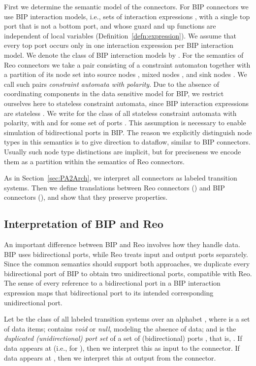 \documentclass[submission,copyright,creativecommons,hidelinks]{eptcs}
\theoremstyle{plain} \newtheorem{theorem}{Theorem}
\theoremstyle{definition}
\theoremstyle{remark}
\newcommand{\defn}[1]{Definition~\ref{defn:#1}}
\newcommand{\secn}[1]{Section~\ref{sec:#1}}
\begin{document}
First we determine the semantic model of the connectors. For BIP connectors we use BIP interaction models, i.e., sets of interaction expressions , with a single top port that is not a bottom port, and whose guard and up functions are independent of local variables (\defn{expression}). We assume that every top port occurs only in one interaction expression per BIP interaction model. We denote the class of BIP interaction models by .
For the semantics of Reo connectors we take a pair consisting of a constraint automaton together with a partition of its node set into source nodes , mixed nodes , and sink nodes . We call such pairs \emph{constraint automata with polarity}. 
Due to the absence of coordinating components in the data sensitive model for BIP, we restrict ourselves here to stateless constraint automata, since BIP interaction expressions are stateless \cite{ABBJS14, BBJS14}.
We write  for the class of all stateless constraint automata with polarity, with  and  for some set of ports . This assumption is necessary to enable simulation of bidirectional ports in BIP. The reason we explicitly distinguish node types in this semantics is to give direction to dataflow, similar to BIP connectors. Usually such node type distinctions are implicit, but for preciseness we encode them as a partition within the semantics of Reo connectors. 

As in \secn{PA2Arch}, we interpret all connectors as labeled transition systems. Then we define translations between Reo connectors () and BIP connectors (), and show that they preserve properties.


\subsection{Interpretation of BIP and Reo}
\label{sec:interpretation2}
An important difference between BIP and Reo involves how they handle data. 
BIP uses bidirectional ports, while Reo treats input and output ports separately.
Since the common semantics should support both approaches, we duplicate every bidirectional port of BIP to obtain two unidirectional ports, compatible with Reo.
The sense of every reference to a bidirectional port in a BIP interaction expression maps that bidirectional port to its intended corresponding unidirectional port.

Let  be the class of all labeled transition systems over an alphabet , where  is a set of data items;  contains \emph{void} or \emph{null}, modeling the absence of data; and  is the \emph{duplicated (unidirectional) port set} of a set of (bidirectional) ports , that is, . If data appears at  (i.e.,  for ), then we interpret this as input to the connector. If data appears at , then we interpret this at output from the connector. 
\end{document}
